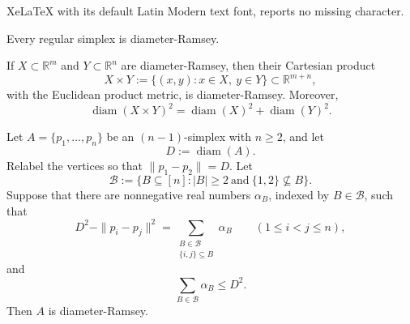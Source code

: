 \documentclass[10pt,a4paper]{amsart}
\DeclareMathOperator{\diam}{diam}
\begin{document}
XeLaTeX with its default Latin Modern text font, reports no missing character.
\begin{lemma}\label{lem:regular}
Every regular simplex is diameter-Ramsey.
\end{lemma}

\begin{lemma}\label{lem:product}
If $X\subset\mathbb R^m$ and $Y\subset\mathbb R^n$ are diameter-Ramsey, then their Cartesian product
\[
X\times Y:=\{(x,y):x\in X,\ y\in Y\}\subset\mathbb R^{m+n},
\]
with the Euclidean product metric, is diameter-Ramsey. Moreover,
\[
\diam(X\times Y)^2=\diam(X)^2+\diam(Y)^2.
\]
\end{lemma}

\begin{theorem}\label{thm:criterion}
Let $A=\{p_1,\dots,p_n\}$ be an $(n-1)$-simplex with $n\ge 2$, and let
\[
D:=\diam(A).
\]
Relabel the vertices so that $\|p_1-p_2\|=D$. Let
\[
\mathcal B:=\{B\subseteq[n]: |B|\ge 2\ \text{and}\ \{1,2\}\nsubseteq B\}.
\]
Suppose that there are nonnegative real numbers $\alpha_B$, indexed by $B\in\mathcal B$, such that
\begin{equation}\label{eq:deficits}
D^2-\|p_i-p_j\|^2
=
\sum_{\substack{B\in\mathcal B\\ \{i,j\}\subseteq B}}\alpha_B
\qquad (1\le i<j\le n),
\end{equation}
and
\begin{equation}\label{eq:mass}
\sum_{B\in\mathcal B}\alpha_B\le D^2.
\end{equation}
Then $A$ is diameter-Ramsey.
\end{theorem}
\end{document}
